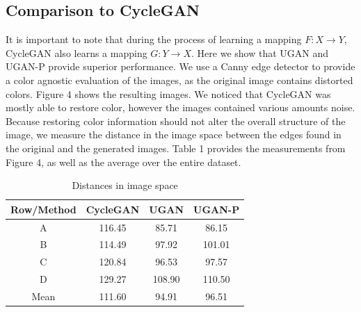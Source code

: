 \documentclass[letterpaper, 10pt, conference]{ieeeconf}
\begin{document}
\subsection{Comparison to CycleGAN}
It is important to note that during the process of learning a mapping $F: X \rightarrow Y$, CycleGAN also learns a
mapping $G: Y \rightarrow X$. Here we show that UGAN and UGAN-P provide superior performance. We use a Canny edge
detector \cite{canny1986computational} to provide a color agnostic evaluation of the images, as the original image
contains distorted colors. Figure 4 shows the resulting images. We noticed that CycleGAN was mostly able to restore
color, however the images contained various amounts noise. Because restoring color information should not alter the
overall structure of the image, we measure the distance in the image space between the edges found in the original 
and the generated images. Table 1 provides the measurements from Figure 4, as well as the average over the entire
dataset.

\begin{table}
\centering
\caption{Distances in image space}
\begin{tabular}{| c | c | c | c |}
   \hline
   Row/Method & CycleGAN & UGAN & UGAN-P \\ \hline
   A          & 116.45 & 85.71  & 86.15  \\ \hline
   B          & 114.49 & 97.92  & 101.01 \\ \hline
   C          & 120.84 & 96.53  & 97.57  \\ \hline
   D          & 129.27 & 108.90 & 110.50 \\ \hline
   Mean       & 111.60 & 94.91  & 96.51 \\ \hline
\end{tabular}
\end{table}

\newpage
\end{document}
